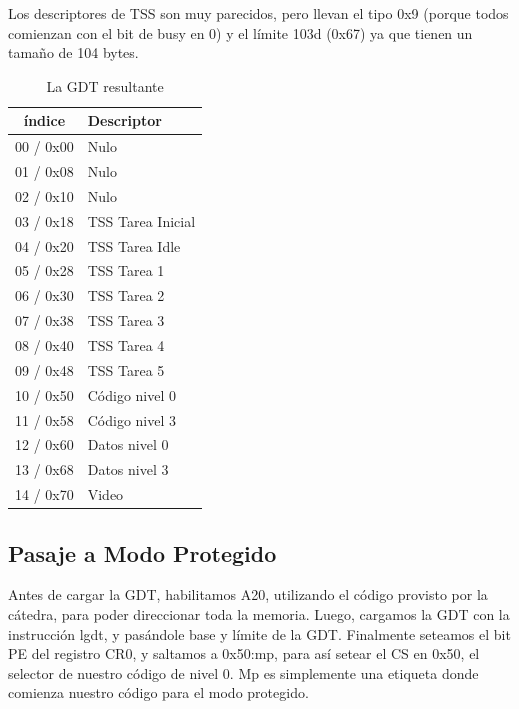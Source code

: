 \documentclass[10pt, a4paper]{article}
\begin{document}
Los descriptores de TSS son muy parecidos, pero llevan el tipo 0x9 (porque todos comienzan con el bit de busy en 0) y el límite 103d (0x67)  ya que tienen un tamaño de 104 bytes.
		
\begin{table}[H]
\centering
    \begin{tabular}{|c|l|}
        \hline
        índice & Descriptor \\ \hline
        00 / 0x00 & Nulo \\ 
        01 / 0x08 & Nulo \\
        02 / 0x10 & Nulo \\ 
        03 / 0x18 & TSS Tarea Inicial \\ 
        04 / 0x20 & TSS Tarea Idle \\ 
        05 / 0x28 & TSS Tarea 1 \\ 
        06 / 0x30 & TSS Tarea 2 \\ 
        07 / 0x38 & TSS Tarea 3  \\ 
        08 / 0x40 & TSS Tarea 4 \\ 
        09 / 0x48 & TSS Tarea 5 \\ 
        10 / 0x50 & Código nivel 0 \\ 
        11 / 0x58 & Código nivel 3 \\ 
        12 / 0x60 & Datos nivel 0 \\ 
        13 / 0x68 & Datos nivel 3 \\ 
        14 / 0x70 & Video\\ 
        \hline
    \end{tabular}
    \caption{La GDT resultante}
\end{table}
\subsection{Pasaje a Modo Protegido}		
Antes de cargar la GDT, habilitamos A20, utilizando el código provisto por la cátedra, para poder direccionar toda la memoria. Luego, cargamos la GDT con la instrucción lgdt, y pasándole base y límite de la GDT. Finalmente seteamos el bit PE del registro CR0, y saltamos a 0x50:mp, para así setear el CS en 0x50, el selector de nuestro código de nivel 0. Mp es simplemente una etiqueta donde comienza nuestro código para el modo protegido.
\end{document}
